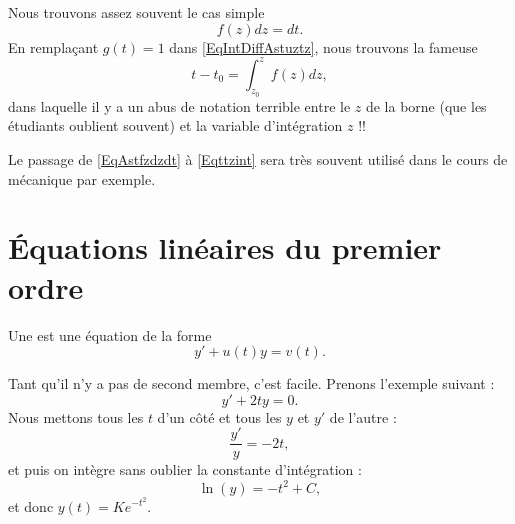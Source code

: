 Nous trouvons assez souvent le cas simple
\begin{equation}    \label{EqAstfzdzdt}
    f(z)dz=dt.
\end{equation}
En remplaçant $g(t)=1$ dans \eqref{EqIntDiffAstuztz}, nous trouvons la fameuse
\begin{equation}        \label{Eqttzint}
    t-t_0=\int_{z_0}^zf(z)dz,
\end{equation}
dans laquelle il y a un abus de notation terrible entre le $z$ de la borne (que les étudiants oublient souvent) et la variable d'intégration $z$ !!

Le passage de \eqref{EqAstfzdzdt} à \eqref{Eqttzint} sera très souvent utilisé dans le cours de mécanique par exemple.

\section{Équations linéaires du premier ordre}

Une  est une équation de la forme
\begin{equation}
	y'+u(t)y=v(t).
\end{equation}

\begin{example}
Tant qu'il n'y a pas de second membre, c'est facile. Prenons l'exemple suivant :
\begin{equation}
	y'+2ty=0.
\end{equation}
Nous mettons tous les $t$ d'un côté et tous les $y$ et $y'$ de l'autre :
\begin{equation}
	\frac{ y' }{ y }=-2t,
\end{equation}
et puis on intègre sans oublier la constante d'intégration :
\begin{equation}
	\ln(y)=-t^2+C,
\end{equation}
et donc $y(t)=K e^{-t^2}$.
\end{example}

